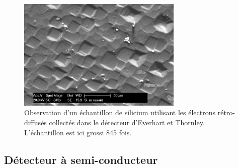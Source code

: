 \documentclass[a4paper,12pt]{article}
\newcommand\ett{Everhart et Thornley\xspace}
\begin{document}
\begin{figure}
\centering
\includegraphics[width=0.7\textwidth]{images/si_er_rasant.png}
\caption{Observation d'un échantillon de silicium utilisant les électrons rétro-diffusés collectés dans le détecteur d'\ett. L'échantillon est ici grossi 845 fois.}
\label{fig:si_er_rasant}
\end{figure}

\subsection{Détecteur à semi-conducteur}
\end{document}

